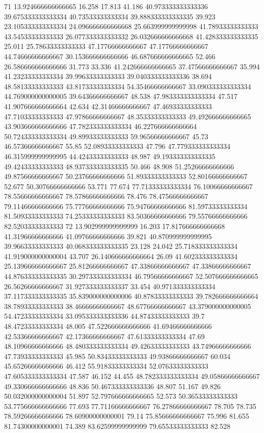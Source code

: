 71 13.924666666666665 16.258 17.813 41.186 40.973333333333336 39.675333333333334 40.73533333333334 39.888333333333335 39.923 23.105333333333334 24.096666666666668 25.663999999999998 41.78933333333333 43.54533333333333 26.077333333333332 26.032666666666668 41.428333333333335 25.011 25.78633333333333 47.17766666666667 47.17766666666667 44.74666666666667 30.153666666666666 46.687666666666665 52.466 26.586666666666666 31.773 33.336 41.242666666666665 37.47566666666667 35.994 41.23233333333334 39.99633333333333 39.040333333333336 38.694 48.58133333333333 43.81733333333334 54.35466666666667 33.090333333333334 44.769000000000005 39.64366666666667 48.538 47.983333333333334 47.517 41.907666666666664 42.634 42.31466666666667 47.46933333333333 47.71033333333333 47.97866666666667 48.35333333333333 49.492666666666665 43.903666666666666 47.782333333333334 46.227666666666664 50.724333333333334 49.89933333333333 59.96566666666667 45.73 46.57366666666667 55.85 52.08933333333333 47.796 47.779333333333334 46.315999999999995 44.42433333333333 48.987 49.193333333333335 49.42433333333333 48.937333333333335 50.466 48.908 51.25266666666666 49.87566666666667 50.23766666666666 51.89333333333333 52.80166666666667 52.677 50.30766666666666 53.771 77.674 77.71333333333334 76.10066666666667 78.55666666666667 78.57866666666666 78.476 78.47566666666667 79.11466666666666 75.77766666666666 75.94766666666666 81.59733333333334 81.50933333333333 74.25333333333333 83.50366666666666 79.55766666666666 82.52033333333333
72 13.902999999999999 16.203 17.817666666666668 41.31966666666666 41.09766666666666 39.821 40.870999999999995 39.96633333333333 40.068333333333335 23.128 24.042 25.718333333333334 41.919000000000004 43.707 26.140666666666664 26.09 41.602333333333334 25.139666666666667 25.81266666666667 47.33866666666667 47.33866666666667 44.876333333333335 30.297333333333334 46.79566666666667 52.507666666666665 26.56266666666667 31.927333333333337 33.454 40.971333333333334 37.117333333333335 35.839000000000006 40.87833333333333 39.782666666666664 38.78933333333333 38.46666666666667 48.67766666666667 43.379000000000005 54.47233333333334 33.095333333333336 44.87433333333333 39.7 48.47233333333334 48.005 47.522666666666666 41.69466666666666 42.53366666666667 42.17366666666667 47.61333333333334 47.69 48.10966666666666 48.480333333333334 49.42633333333333 43.74966666666666 47.73933333333333 45.985 50.83433333333333 49.93866666666667 60.034 45.65266666666666 46.412 55.91833333333334 52.07633333333333 47.605333333333334 47.587 46.152 44.455 48.782333333333334 49.05866666666667 49.330666666666666 48.836 50.467333333333336 48.807 51.167 49.826 50.032000000000004 51.897 52.797666666666665 52.573 50.36533333333333 53.775666666666666 77.693 77.71166666666667 76.27866666666667 78.705 78.735 78.59266666666666 78.60900000000001 79.14 75.85666666666667 75.996 81.655 81.74300000000001 74.389 83.62599999999999 79.65533333333333 82.528
